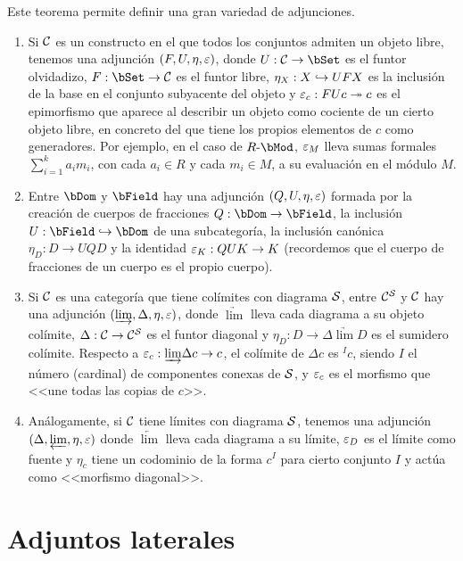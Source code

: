 \begin{example}
  Este teorema permite definir una gran variedad de adjunciones.
  \begin{enumerate}
  \item Si $\mathcal{C}$ es un constructo en el que todos los conjuntos admiten un
    objeto libre, tenemos una adjunción $(F,U,\eta,\varepsilon)$, donde $U:\cC\to\bSet$
    es el funtor olvidadizo, $F:\bSet\to\cC$ es el funtor libre,
    $\eta_X:X\hookrightarrow UFX$ es la inclusión de la base en el conjunto subyacente del
    objeto y $\varepsilon_c:FUc\twoheadrightarrow c$ es el epimorfismo que aparece al describir un
    objeto como cociente de un cierto objeto libre, en concreto del que tiene
    los propios elementos de $c$ como generadores. Por ejemplo, en el caso de
    $R\dash\bMod$, $\varepsilon_M$ lleva sumas formales $\sum_{i=1}^ka_im_i$, con cada
    $a_i\in R$ y cada $m_i\in M$, a su evaluación en el módulo $M$.
  \item Entre $\bDom$ y $\bField$ hay una adjunción $(Q,U,\eta,\varepsilon)$ formada
    por la creación de cuerpos de fracciones $Q:\bDom\to\bField$, la inclusión
    $U:\bField\inTo\bDom$ de una subcategoría, la inclusión canónica
    $\eta_D:D\to UQD$ y la identidad $\varepsilon_K:QUK\to K$ (recordemos que el cuerpo
    de fracciones de un cuerpo es el propio cuerpo).
  \item Si $\mathcal{C}$ es una categoría que tiene colímites con diagrama $\mathcal{S}$, entre
    $\mathcal{C}^{\mathcal{S}}$ y $\mathcal{C}$ hay una adjunción
    $(\underrightarrow{\lim},\Delta,\eta,\varepsilon)$, donde $\underrightarrow{\lim}$
    lleva cada diagrama a su objeto colímite, $\Delta:\mathcal{C}\to\mathcal{C}^{\mathcal{S}}$ es el
    funtor diagonal y $\eta_D:D\to\Delta\underrightarrow{\lim}D$ es el sumidero
    colímite. Respecto a $\varepsilon_c:\underrightarrow{\lim}\Delta c\to c$, el
    colímite de $\Delta c$ es $^Ic$, siendo $I$ el número (cardinal) de
    componentes conexas de $\mathcal{S}$, y $\varepsilon_c$ es el morfismo que <<une todas las
    copias de $c$>>.
  \item Análogamente, si $\mathcal{C}$ tiene límites con diagrama $\mathcal{S}$, tenemos una
    adjunción $(\Delta,\underleftarrow{\lim},\eta,\varepsilon)$ donde
    $\underleftarrow{\lim}$ lleva cada diagrama a su límite, $\varepsilon_D$ es el
    límite como fuente y $\eta_c$ tiene un codominio de la forma $c^I$ para
    cierto conjunto $I$ y actúa como <<morfismo diagonal>>.
  \end{enumerate}
\end{example}

\section{Adjuntos laterales}

